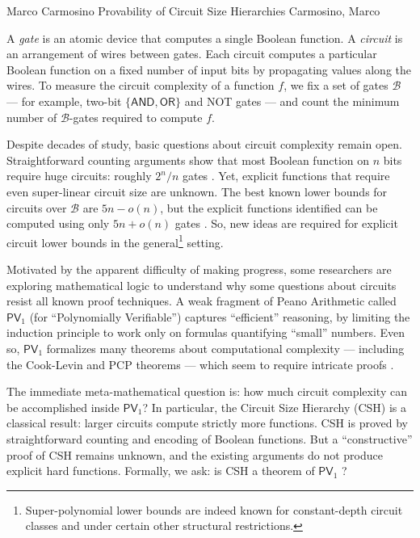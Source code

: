 \documentclass[report]{owrart}
\begin{document}
\begin{report}
    

    \begin{talk}{Marco Carmosino}
      {Provability of Circuit Size Hierarchies}
      {Carmosino, Marco}
      
      \noindent
      A \emph{gate} is an atomic device that computes a single Boolean function.  A \emph{circuit} is an arrangement of wires between gates.  Each circuit computes a particular Boolean function on a fixed number of input bits by propagating values along the wires.  To measure the circuit complexity of a function $f$, we fix a set of gates $\mathcal{B}$ --- for example, two-bit $\{\mathsf{AND}, \textsf{OR}\}$ and \textsf{NOT} gates --- and count the minimum number of $\mathcal{B}$-gates required to compute $f$.
      
      Despite decades of study, basic questions about circuit complexity remain open.  Straightforward counting arguments show that most Boolean function on $n$ bits require huge circuits: roughly $2^n/n$ gates \cite{Sha49}.  Yet, explicit functions that require even super-linear circuit size are unknown.  The best known lower bounds for circuits over $\mathcal{B}$ are $5n - o(n)$, but the explicit functions identified  can be computed using only $5n + o(n)$  gates \cite{IwamaM02, AmanoT11}.  So, new ideas are required for explicit circuit lower bounds in the general\footnote{Super-polynomial lower bounds are indeed known for constant-depth circuit classes and under certain other structural restrictions.} setting.
      
      Motivated by the apparent difficulty of making progress, some researchers are exploring mathematical logic to understand why some questions about circuits resist all known proof techniques.  A weak fragment of Peano Arithmetic called $\mathsf{PV}_1$ (for ``Polynomially Verifiable'') captures ``efficient'' reasoning, by limiting the induction principle to work only on formulas quantifying ``small'' numbers.  Even so, $\mathsf{PV}_1$ formalizes many theorems about computational complexity --- including the Cook-Levin and PCP theorems --- which seem to require intricate proofs \cite{Pich14}.
      
      The immediate meta-mathematical question is: how much circuit complexity can be accomplished inside $\mathsf{PV}_1$?  In particular, the Circuit Size Hierarchy (CSH) is a classical result: larger circuits compute strictly more functions.  CSH is proved by straightforward counting and encoding of Boolean functions.  But a ``constructive'' proof of CSH remains unknown, and the existing arguments do not produce explicit hard functions.  Formally, we ask: is CSH a theorem of $\mathsf{PV}_1$ ?
      

\end{talk}
\end{report}
\end{document}

